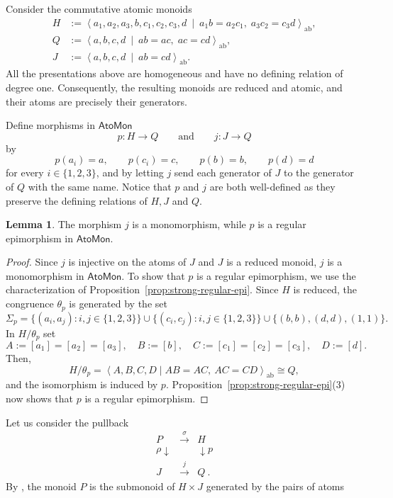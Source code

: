 \documentclass[a4paper,10pt,reqno]{amsart}
\theoremstyle{definition}
\newtheorem{lemma}[theorem]{Lemma}
\theoremstyle{remark}
\newcommand{\AtoMon}{\mathsf{AtoMon}}
\begin{document}
\medskip


Consider the commutative atomic monoids
\begin{align*}
H&:=
\left\langle
 a_1,a_2,a_3,b,c_1,c_2,c_3,d
 \ \middle|\
 a_1b=a_2c_1,\;a_3c_2=c_3d
\right\rangle_{\mathrm{ab}},\\
Q&:=
\left\langle
 a,b,c,d
 \ \middle|\
 ab=ac,\; ac=cd
\right\rangle_{\mathrm{ab}},\\
J&:=
\left\langle
 a,b,c,d
 \ \middle|\
 ab=cd
\right\rangle_{\mathrm{ab}}.
\end{align*}
All the presentations above are
homogeneous and have no defining relation of degree one. Consequently,
the resulting monoids are reduced and atomic, and their atoms are
precisely their generators.

Define morphisms in $\AtoMon$
$$
 p:H\to Q
 \qquad\text{and}\qquad
 j:J\to Q
$$
by
$$
 p(a_i)=a,\qquad
 p(c_i)=c,\qquad
 p(b)=b,\qquad
 p(d)=d
$$
for every $i\in\{1,2,3\}$, and by letting $j$ send each generator of
$J$ to the generator of $Q$ with the same name. Notice that $p$ and $j$ are both well-defined as they preserve the defining relations of $H,J$ and $Q$.

\begin{lemma}\label{lem:monoregepi}
The morphism $j$ is a monomorphism, while $p$ is a regular epimorphism in $\AtoMon$.
\end{lemma} 

\begin{proof}
Since $j$ is injective on the atoms of $J$ and $J$ is a reduced monoid, $j$ is a monomorphism in $\AtoMon$.
To show that $p$ is a regular epimorphism, we use the characterization of Proposition~\ref{prop:strong-regular-epi}. Since $H$ is reduced, the
congruence $\theta_p$ is generated by the set
$$
\Sigma_p=
   \{(a_i,a_j):i,j\in\{1,2,3\}\}
   \cup
   \{(c_i,c_j):i,j\in\{1,2,3\}\} \cup \{(b,b),(d,d), (1,1)\}.
$$
In $H/\theta_p$ set
$$
 A:=[a_1]=[a_2]=[a_3], \quad B:=[b], \quad C:=[c_1]=[c_2]=[c_3], \quad D:=[d].
$$
Then, 
$$
 H/\theta_p=
 \left\langle A,B,C,D\mid AB=AC,\ AC=CD
 \right\rangle_{\mathrm{ab}} \cong Q,
$$
and the isomorphism is induced by $p$. Proposition~\ref{prop:strong-regular-epi}(3) now shows that $p$ is a
regular epimorphism.
\end{proof}

Let us consider the pullback
$$
\begin{matrix}
P&\xrightarrow{\sigma}&H\\
{\scriptstyle \rho}\downarrow&&\downarrow{\scriptstyle p}\\
J&\xrightarrow{j}&Q \ .
\end{matrix}
$$
By \cite[Proposition~6.5]{CCT}, the monoid $P$ is the submonoid of
$H\times J$ generated by the pairs of atoms
\end{document}

